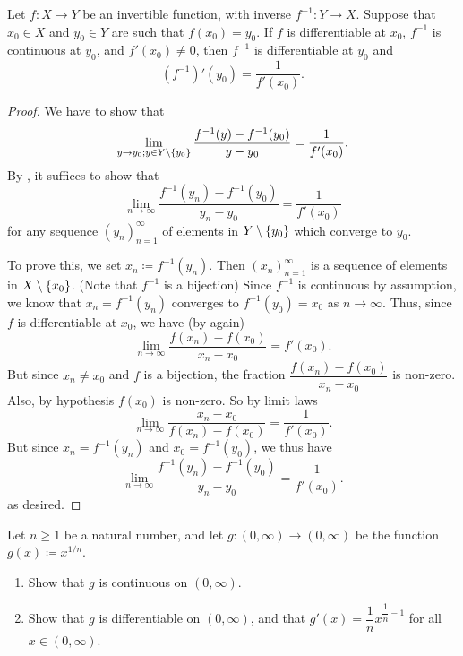 \begin{thm}\label{i:10.4.2}
  Let \(f : X \to Y\) be an invertible function, with inverse \(f^{-1} : Y \to X\).
  Suppose that \(x_0 \in X\) and \(y_0 \in Y\) are such that \(f(x_0) = y_0\).
  If \(f\) is differentiable at \(x_0\), \(f^{-1}\) is continuous at \(y_0\), and \(f'(x_0 ) \neq 0\), then \(f^{-1}\) is differentiable at \(y_0\) and
  \[
    (f^{-1})'(y_0) = \dfrac{1}{f'(x_0)}.
  \]
\end{thm}

\begin{proof}
  We have to show that
  \[
    \lim_{y \to y_0 ; y \in Y \setminus \left\lbrace y_0\right\rbrace} \dfrac{f^{-1}(y) - f^{-1}(y_0)}{y - y_0} = \dfrac{1}{f'(x_0)}.
  \]
  By , it suffices to show that
  \[
    \lim_{n \to \infty} \dfrac{f^{-1}(y_n) - f^{-1}(y_0)}{y_n - y_0} = \dfrac{1}{f'(x_0)}
  \]
  for any sequence \((y_n)_{n = 1}^\infty\) of elements in \(Y \setminus \left\lbrace y_0\right\rbrace\) which converge to \(y_0\).

  To prove this, we set \(x_n \coloneqq f^{-1}(y_n)\).
  Then \((x_n)_{n = 1}^\infty\) is a sequence of elements in \(X \setminus \left\lbrace x_0\right\rbrace\).
  (Note that \(f^{-1}\) is a bijection)
  Since \(f^{-1}\) is continuous by assumption, we know that \(x_n = f^{-1}(y_n)\) converges to \(f^{-1}(y_0) = x_0\) as \(n \to \infty\).
  Thus, since \(f\) is differentiable at \(x_0\), we have (by  again)
  \[
    \lim_{n \to \infty} \dfrac{f(x_n) - f(x_0)}{x_n - x_0} = f'(x_0).
  \]
  But since \(x_n \neq x_0\) and \(f\) is a bijection, the fraction \(\dfrac{f(x_n) - f(x_0)}{x_n - x_0}\) is non-zero.
  Also, by hypothesis \(f(x_0)\) is non-zero.
  So by limit laws
  \[
    \lim_{n \to \infty} \dfrac{x_n - x_0}{f(x_n) - f(x_0)} = \dfrac{1}{f'(x_0)}.
  \]
  But since \(x_n = f^{-1}(y_n)\) and \(x_0 = f^{-1}(y_0)\), we thus have
  \[
    \lim_{n \to \infty} \dfrac{f^{-1}(y_n) - f^{-1}(y_0)}{y_n - y_0} = \dfrac{1}{f'(x_0)}.
  \]
  as desired.
\end{proof}

\exercisesection

\begin{ex}\label{i:ex:10.4.1}
  Let \(n \geq 1\) be a natural number, and let \(g : (0, \infty) \to (0, \infty)\) be the function \(g(x) \coloneqq x^{1 / n}\).
  \begin{enumerate}
    \item\label{i:ex:10.4.1.a} Show that \(g\) is continuous on \((0, \infty)\).
    \item\label{i:ex:10.4.1.b} Show that \(g\) is differentiable on \((0, \infty)\), and that \(g'(x) = \dfrac{1}{n} x^{\dfrac{1}{n} - 1}\) for all \(x \in (0, \infty)\).
  \end{enumerate}
\end{ex}

